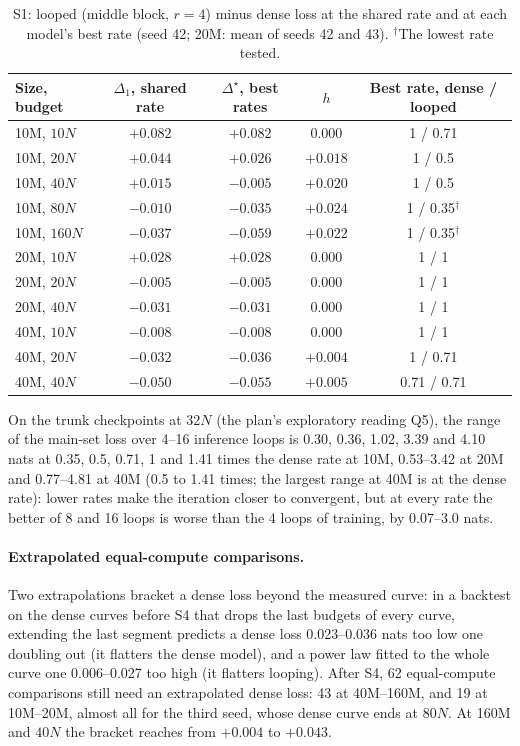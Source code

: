 \begin{table}[h]
  \centering
  \caption{S1: looped (middle block, $r = 4$) minus dense loss at the shared rate and at each model's best rate (seed 42;
  20M: mean of seeds 42 and 43). $^{\dagger}$The lowest rate tested.}
  \label{tab:s1}
  \small
  \begin{tabular}{lcccc}
    \toprule
    Size, budget & $\Delta_1$, shared rate & $\Delta^{\star}$, best rates & $h$ & Best rate, dense / looped \\
    \midrule
    10M, $10N$  & $+0.082$ & $+0.082$ & 0.000 & 1 / 0.71 \\
    10M, $20N$  & $+0.044$ & $+0.026$ & $+0.018$ & 1 / 0.5 \\
    10M, $40N$  & $+0.015$ & $-0.005$ & $+0.020$ & 1 / 0.5 \\
    10M, $80N$  & $-0.010$ & $-0.035$ & $+0.024$ & 1 / 0.35$^{\dagger}$ \\
    10M, $160N$ & $-0.037$ & $-0.059$ & $+0.022$ & 1 / 0.35$^{\dagger}$ \\
    20M, $10N$  & $+0.028$ & $+0.028$ & $0.000$ & 1 / 1 \\
    20M, $20N$  & $-0.005$ & $-0.005$ & $0.000$ & 1 / 1 \\
    20M, $40N$  & $-0.031$ & $-0.031$ & $0.000$ & 1 / 1 \\
    40M, $10N$  & $-0.008$ & $-0.008$ & $0.000$ & 1 / 1 \\
    40M, $20N$  & $-0.032$ & $-0.036$ & $+0.004$ & 1 / 0.71 \\
    40M, $40N$  & $-0.050$ & $-0.055$ & $+0.005$ & 0.71 / 0.71 \\
    \bottomrule
  \end{tabular}
\end{table}

On the trunk checkpoints at $32N$ (the plan's exploratory reading Q5), the range of the main-set loss over 4--16
inference loops is 0.30, 0.36, 1.02, 3.39 and 4.10 nats at 0.35, 0.5, 0.71, 1 and 1.41 times the dense rate at 10M,
0.53--3.42 at 20M and 0.77--4.81 at 40M (0.5 to 1.41 times; the largest range at 40M is at the dense rate): lower rates make the iteration closer to convergent, but at every rate the better of 8 and 16 loops
is worse than the 4 loops of training, by 0.07--3.0 nats.

\paragraph{Extrapolated equal-compute comparisons.} Two extrapolations bracket a dense loss beyond the measured curve:
in a backtest on the dense curves before S4 that drops the last budgets of every curve, extending the last segment predicts a dense
loss 0.023--0.036 nats too low one doubling out (it flatters the dense model), and a power law fitted to the whole curve
one 0.006--0.027 too high (it flatters looping). After S4, 62 equal-compute comparisons still need an extrapolated dense
loss: 43 at 40M--160M, and 19 at 10M--20M, almost all for the third seed, whose dense curve ends at $80N$. At 160M and
$40N$ the bracket reaches from $+0.004$ to $+0.043$.

